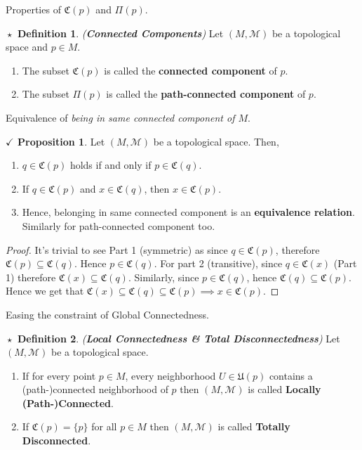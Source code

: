 \documentclass{article}
\theoremstyle{definition}
\newtheorem{definition}{$\boxed{\star}$ Definition}
\newcommand{\tit}[1]{\textit{#1}}
\theoremstyle{remark}
\theoremstyle{definition}
\theoremstyle{definition}
\newtheorem{proposition}{$\checkmark$ Proposition}
\newcommand{\topo}[1]{\mathcal{#1}}
\newcommand{\nbdsys}[2]{\mathfrak{#1}(#2)}
\newcommand{\conncomp}[1]{\mathfrak{C}(#1)}
\newcommand{\pathconncomp}[1]{\Pi(#1)}
\begin{document}
\newpage
\hrulefill
Properties of $ \conncomp{p} $ and $ \pathconncomp{p} $.
\hrulefill
\begin{definition}
	\tit{(\textbf{Connected Components})} Let $ (M,\topo{M}) $ be a topological space and $ p\in M $.
	\begin{enumerate}
		\item{The subset $ \conncomp{p} $ is called the \textbf{connected component} of $ p $.}
		\item{The subset $ \pathconncomp{p} $ is called the \textbf{path-connected component} of $ p $.}
	\end{enumerate}
\end{definition}
\hrulefill
Equivalence of \textit{being in same connected component of $ M $}.
\hrulefill
\begin{proposition}
	Let $ (M,\topo{M}) $ be a topological space. Then,
	\begin{enumerate}
		\item{$ q\in \conncomp{p} $ holds if and only if $ p \in \conncomp{q} $.}
		\item{If $ q \in \conncomp{p} $ and $ x \in \conncomp{q} $, then $ x\in \conncomp{p} $.}
		\item{Hence, belonging in same connected component is an \textbf{equivalence relation}. Similarly for path-connected component too.}
	\end{enumerate}
\end{proposition}
\begin{proof}
	It's trivial to see Part 1 (symmetric) as since $ q\in \conncomp{p} $, therefore $ \conncomp{p} \subseteq \conncomp{q} $. Hence $ p\in \conncomp{q} $. For part 2 (transitive), since $ q\in \conncomp{x} $ (Part 1) therefore $ \conncomp{x} \subseteq \conncomp{q} $. Similarly, since $ p\in \conncomp{q} $, hence $ \conncomp{q} \subseteq \conncomp{p} $. Hence we get that $ \conncomp{x} \subseteq \conncomp{q} \subseteq \conncomp{p} \implies x \in \conncomp{p}$.
\end{proof}
\hrulefill
Easing the constraint of Global Connectedness.
\hrulefill
\begin{definition}
	\tit{(\textbf{Local Connectedness \& Total Disconnectedness})} Let $ (M,\topo{M}) $ be a topological space.
	\begin{enumerate}
		\item{If for every point $ p\in M $, every neighborhood $ U\in \nbdsys{U}{p} $ contains a (path-)connected neighborhood of $ p $ then $ (M,\topo{M}) $ is called \textbf{Locally (Path-)Connected}.}
		\item{If $ \conncomp{p} = \{p\} $ for all $ p\in M $ then $ (M,\topo{M}) $ is called \textbf{Totally Disconnected}.}
	\end{enumerate}
\end{definition}
\end{document}
